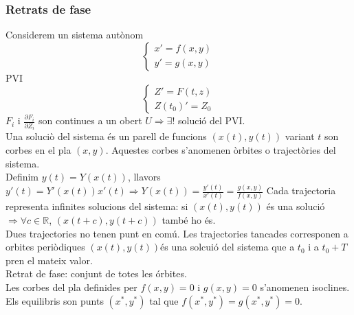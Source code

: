 \documentclass[../main.tex]{subfiles}
\begin{document}
\subsubsection{Retrats de fase}
Considerem un sistema autònom
\begin{displaymath}
	\begin{cases}
		x' = f(x, y)\\
		y' = g(x, y)
	\end{cases}
\end{displaymath}
PVI
\begin{displaymath}
	\begin{cases}
		Z' = F(t, z)\\
		Z(t_0)' = Z_0
	\end{cases}
\end{displaymath}
$F_i$ i $\frac{\partial F_i}{\partial Z_i}$ son continues a un obert $U \Rightarrow \exists!$ solució del PVI.\\
Una soluciò del sistema és un parell de funcions $(x(t),y(t))$ variant $t$ son corbes en el pla $(x,y)$. Aquestes corbes s'anomenen òrbites o trajectòries del sistema.\\
Definim $y(t) = Y(x(t))$, llavors $y'(t)=Y'(x(t))x'(t) \Rightarrow Y(x(t)) = \frac{y'(t)}{x'(t)} = \frac{g(x,y)}{f(x,y)}$
Cada trajectoria representa infinites solucions del sistema: si $(x(t), y(t))$ és una solució $\Rightarrow \forall c \in \mathbb{R}$, $(x(t+c), y(t+c))$ també ho és.\\
Dues trajectories no tenen punt en comú. Les trajectories tancades corresponen a orbites periòdiques $(x(t), y(t))$és una solcuió del sistema que a $t_0$ i a $t_0 + T$ pren el mateix valor.\\
Retrat de fase: conjunt de totes les órbites.\\
Les corbes del pla definides per $f(x,y) = 0$ i $g(x,y) = 0$ s'anomenen isoclines.\\
Els equilibris son punts $(x^*, y^*)$ tal que $f(x^*, y^*) = g(x^*, y^*) = 0$.\\
\end{document}
